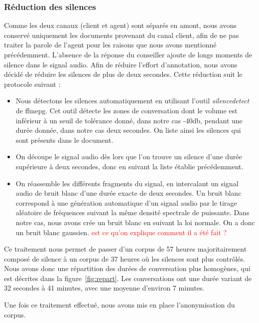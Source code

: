 \subsubsection{Réduction des silences}
Comme les deux canaux (client et agent) sont séparés en amont, nous avons conservé uniquement les documents provenant du canal client, afin de ne pas traiter la parole de l'agent pour les raisons que nous avons mentionné précédemment.
L'absence de la réponse du conseiller ajoute de longs moments de silence dans le signal audio. Afin de réduire l'effort d'annotation, nous avons décidé de réduire les silences de plus de deux secondes. Cette réduction suit le protocole suivant :
\begin{itemize}
  \item Nous détectons les silences automatiquement en utilisant l'outil \textit{silencedetect} de ffmepg. Cet outil détecte les zones de conversation dont le volume est inférieur à un seuil de tolérance donné, dans notre cas -40db, pendant une durée donnée, dans notre cas deux secondes. On liste ainsi les silences qui sont présents dans le document.
  \item On découpe le signal audio dès lors que l'on trouve un silence d'une durée supérieure à deux secondes, donc en suivant la liste établie précédemment.
  \item On réassemble les différents fragments du signal, en intercalant un signal audio de bruit blanc d'une durée exacte de deux secondes. Un bruit blanc correspond à une génération automatique d'un signal audio par le tirage aléatoire de fréquences suivant la même densité spectrale de puissante. Dans notre cas, nous avons crée un bruit blanc en suivant la loi normale. On a donc un bruit blanc gaussien. \textcolor{red}{est ce qu'on explique comment il a été fait ?}
\end{itemize}

Ce traitement nous permet de passer d'un corpus de 57 heures majoritairement composé de silence à un corpus de 37 heures où les silences sont plus contrôlés. Nous avons donc une répartition des durées de conversation plus homogènes, qui est décrites dans la figure~\ref{fig:repart}. Les conversations ont une durée variant de 32 secondes à 41 minutes, avec une moyenne d'environ 7 minutes.

Une fois ce traitement effectué, nous avons mis en place l'anonymisation du corpus.

